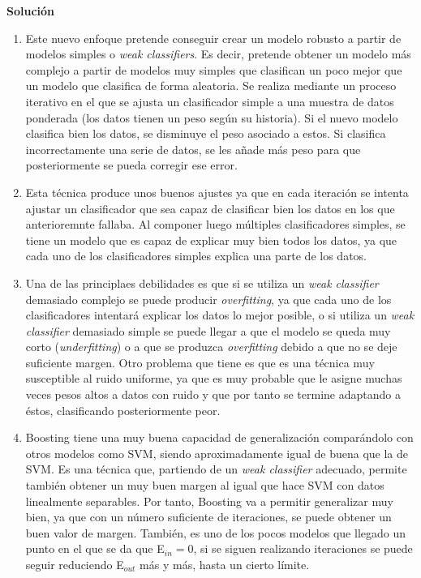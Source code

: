 \documentclass[11pt,a4paper]{article}
\newcommand{\answer}{\noindent\textbf{Solución}}
\begin{document}
\answer

\begin{enumerate}[label=\textit{\alph*})]
	\item Este nuevo enfoque pretende conseguir crear un modelo robusto a partir de modelos simples o \textit{weak classifiers}.
	Es decir, pretende obtener un modelo más complejo a partir de modelos muy simples que clasifican un poco mejor que un
	modelo que clasifica de forma aleatoria. Se realiza mediante un proceso iterativo en el que se ajusta un clasificador simple
	a una muestra de datos ponderada (los datos tienen un peso según su historia). Si el nuevo modelo clasifica bien los datos,
	se disminuye el peso asociado a estos. Si clasifica incorrectamente una serie de datos, se les añade más peso para que 
	posteriormente se pueda corregir ese error.
	\item Esta técnica produce unos buenos ajustes ya que en cada iteración se intenta ajustar un clasificador que sea capaz de
	clasificar bien los datos en los que anterioremnte fallaba. Al componer luego múltiples clasificadores simples, se tiene un
	modelo que es capaz de explicar muy bien todos los datos, ya que cada uno de los clasificadores simples explica una parte
	de los datos.
	\item Una de las principlaes debilidades es que si se utiliza un \textit{weak classifier} demasiado complejo se
	puede producir \textit{overfitting}, ya que cada uno de los clasificadores intentará explicar los datos lo mejor posible, o
	si utiliza un \textit{weak classifier} demasiado simple se puede llegar a que el modelo se queda muy corto (\textit{underfitting})
	o a que se produzca \textit{overfitting} debido a que no se deje suficiente margen. Otro problema que tiene es que es una
	técnica muy susceptible al ruido uniforme, ya que es muy probable que le asigne muchas veces pesos altos a datos con ruido
	y que por tanto se termine adaptando a éstos, clasificando posteriormente peor.
	\item Boosting tiene una muy buena capacidad de generalización comparándolo con otros modelos como SVM, siendo aproximadamente
	igual de buena que la de SVM. Es una técnica que, partiendo de un \textit{weak classifier} adecuado, permite también obtener un
	muy buen margen al igual que hace SVM con datos linealmente separables. Por tanto, Boosting va a permitir generalizar muy bien,
	ya que con un número suficiente de iteraciones, se puede obtener un buen valor de margen. También, es uno de los pocos modelos que
	llegado un punto en el que se da que E$_{in} = 0$, si se siguen realizando iteraciones se puede seguir reduciendo E$_{out}$
	más y más, hasta un cierto límite.
\end{enumerate}
\end{document}
